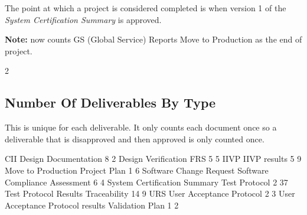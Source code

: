 \documentclass{article}
\begin{document}
The point at which a project is considered completed is when version 1 of the
\textit{System Certification Summary} is approved.

\textbf{Note:} now counts GS (Global Service) Reports Move to Production as the end
of project.

\begin{Schunk}
\begin{Soutput}
[1] 2
\end{Soutput}
\end{Schunk}


\subsection{Number Of Deliverables By Type}
This is unique for each deliverable. It only counts each document once so a deliverable
that is disapproved and then approved is only counted once.

\begin{Schunk}
\begin{Soutput}
                             CII             Design Documentation 
                               8                                2 
             Design Verification                              FRS 
                               5                                5 
                            IIVP                     IIVP results 
                               5                                9 
              Move to Production                     Project Plan 
                               1                                6 
         Software Change Request   Software Compliance Assessment 
                               6                                4 
    System Certification Summary                    Test Protocol 
                               2                               37 
           Test Protocol Results                     Traceability 
                              14                                9 
                             URS         User Acceptance Protocol 
                               2                                3 
User Acceptance Protocol results                  Validation Plan 
                               1                                2 
\end{Soutput}
\end{Schunk}
\end{document}
